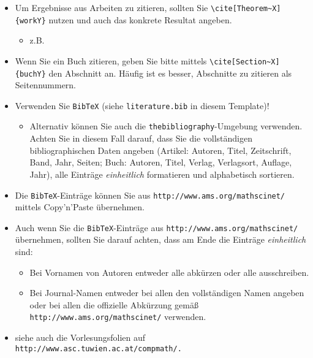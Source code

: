 \documentclass[a4paper,11pt,bibliography=totoc,listof=totoc,headinclude=true,cleardoublepage=empty,oneside]{scrbook}
\begin{document}
{\color{change}
\begin{itemize}
\item Um Ergebnisse aus Arbeiten zu zitieren, sollten Sie \verb$\cite[Theorem~X]{workY}$ nutzen und auch das konkrete Resultat angeben.
\begin{itemize}
\item z.B.\ \cite[Theorem~4]{MR3457440}
\end{itemize}

\item Wenn Sie ein Buch zitieren, geben Sie bitte mittels \verb$\cite[Section~X]{buchY}$
den Abschnitt an. Häufig ist es besser, Abschnitte zu zitieren als Seitennummern.

\item Verwenden Sie \verb$BibTeX$ (siehe \verb$literature.bib$ in diesem Template)!
\begin{itemize}
\item Alternativ können Sie auch die \verb$thebibliography$-Umgebung verwenden. Achten Sie in diesem Fall darauf, dass Sie die vollständigen bibliographischen Daten angeben (Artikel: Autoren, Titel, Zeitschrift, Band, Jahr, Seiten; Buch: Autoren, Titel, Verlag, Verlagsort, Auflage, Jahr), alle Einträge \emph{einheitlich} formatieren und alphabetisch sortieren. 
\end{itemize}

\item Die \verb$BibTeX$-Einträge können Sie aus \verb$http://www.ams.org/mathscinet/$ mittels Copy'n'Paste überneh\-men.
\item Auch wenn Sie die \verb$BibTeX$-Einträge aus \verb$http://www.ams.org/mathscinet/$ über\-neh\-men, sollten Sie darauf achten, dass am Ende die Einträge \emph{einheitlich} sind:
\begin{itemize}
\item Bei Vornamen von Autoren entweder alle abkürzen oder alle ausschreiben. 
\item Bei Journal-Namen entweder bei allen den vollständigen Namen angeben oder
bei allen die offizielle Abkürzung gemäß \verb$http://www.ams.org/mathscinet/$ verwenden.
\end{itemize}

\item siehe auch die Vorlesungsfolien auf \verb$http://www.asc.tuwien.ac.at/compmath/.$

\end{itemize}
}

\end{document}
